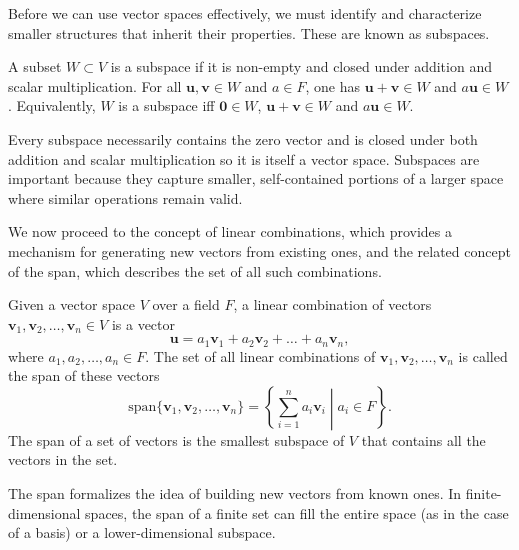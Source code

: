 Before we can use vector spaces effectively, we must identify and characterize smaller structures that inherit their properties. These are known as subspaces.
\begin{definition}[Subspace]
A subset $W\subset V$ is a subspace if it is non-empty and closed under addition and scalar multiplication. For all $\symbf{u},\symbf{v}\in W$ and $a\in F$, one has $\symbf{u}+\symbf{v}\in W$ and $a\symbf{u}\in W$. Equivalently, $W$ is a subspace iff $\symbf{0}\in W$, $\symbf{u}+\symbf{v}\in W$ and $a\symbf{u}\in W$.
\end{definition}
Every subspace necessarily contains the zero vector and is closed under both addition and scalar multiplication so it is itself a vector space. Subspaces are important because they capture smaller, self-contained portions of a larger space where similar operations remain valid.

We now proceed to the concept of linear combinations, which provides a mechanism for generating new vectors from existing ones, and the related concept of the span, which describes the set of all such combinations.
\begin{definition}
Given a vector space $V$ over a field $F$, a linear combination of vectors $\symbf{v}_1,\symbf{v}_2,\ldots,\symbf{v}_n\in V$ is a vector
\begin{equation}
\symbf{u}=a_1\symbf{v}_1+a_2\symbf{v}_2+\ldots+a_n\symbf{v}_n,
\end{equation}
where $a_1,a_2,\ldots,a_n\in F$. The set of all linear combinations of ${\symbf{v}_1,\symbf{v}_2,\ldots,\symbf{v}_n}$ is called the span of these vectors
\begin{equation}
\text{span}\lbrace\symbf{v}_1,\symbf{v}_2,\ldots,\symbf{v}_n\rbrace=\left\lbrace\sum_{i=1}^n a_i\symbf{v}_i\middle\vert a_i\in F\right\rbrace.
\end{equation}
The span of a set of vectors is the smallest subspace of $V$ that contains all the vectors in the set.
\end{definition}
The span formalizes the idea of building new vectors from known ones. In finite-dimensional spaces, the span of a finite set can fill the entire space (as in the case of a basis) or a lower-dimensional subspace.

